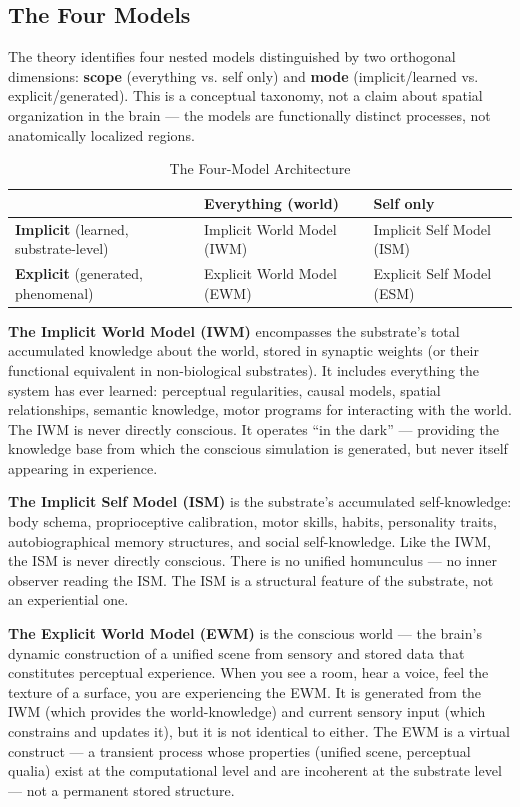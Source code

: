 \documentclass[12pt]{article}
\begin{document}
\subsection{The Four Models}


The theory identifies four nested models distinguished by two orthogonal dimensions: \textbf{scope} (everything vs. self only) and \textbf{mode} (implicit/learned vs. explicit/generated). This is a conceptual taxonomy, not a claim about spatial organization in the brain --- the models are functionally distinct processes, not anatomically localized regions.

\begin{table}[htbp]
\caption{The Four-Model Architecture}
\centering
\small
\begin{tabular}{lll}
\toprule
 & \textbf{Everything (world)} & \textbf{Self only} \\
\midrule
\textbf{Implicit} (learned, substrate-level) & Implicit World Model (IWM) & Implicit Self Model (ISM) \\
\textbf{Explicit} (generated, phenomenal) & Explicit World Model (EWM) & Explicit Self Model (ESM) \\
\bottomrule
\end{tabular}
\end{table}


\textbf{The Implicit World Model (IWM)} encompasses the substrate's total accumulated knowledge about the world, stored in synaptic weights (or their functional equivalent in non-biological substrates). It includes everything the system has ever learned: perceptual regularities, causal models, spatial relationships, semantic knowledge, motor programs for interacting with the world. The IWM is never directly conscious. It operates ``in the dark'' --- providing the knowledge base from which the conscious simulation is generated, but never itself appearing in experience.

\textbf{The Implicit Self Model (ISM)} is the substrate's accumulated self-knowledge: body schema, proprioceptive calibration, motor skills, habits, personality traits, autobiographical memory structures, and social self-knowledge. Like the IWM, the ISM is never directly conscious. There is no unified homunculus --- no inner observer reading the ISM. The ISM is a structural feature of the substrate, not an experiential one.

\textbf{The Explicit World Model (EWM)} is the conscious world --- the brain's dynamic construction of a unified scene from sensory and stored data that constitutes perceptual experience. When you see a room, hear a voice, feel the texture of a surface, you are experiencing the EWM. It is generated from the IWM (which provides the world-knowledge) and current sensory input (which constrains and updates it), but it is not identical to either. The EWM is a virtual construct --- a transient process whose properties (unified scene, perceptual qualia) exist at the computational level and are incoherent at the substrate level --- not a permanent stored structure.
\end{document}
